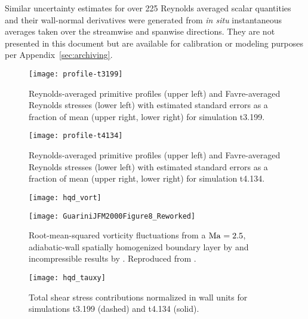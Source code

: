 Similar uncertainty estimates for over 225 Reynolds averaged scalar quantities
and their wall-normal derivatives were generated from \emph{in situ}
instantaneous averages taken over the streamwise and spanwise directions.  They
are not presented in this document but are available for calibration or modeling
purposes per Appendix~\ref{sec:archiving}.

\begin{figure}
\centering
\texttt{[image: profile-t3199]}
\caption[Profiles with quantified uncertainty for simulation t3.199]{%
    Reynolds-averaged primitive profiles (upper left) and Favre-averaged
    Reynolds stresses (lower left) with estimated standard errors
    as a fraction of mean (upper right, lower right) for simulation
    t3.199.\label{fig:profile-t3199}
}
\end{figure}

\begin{figure}
\centering
\texttt{[image: profile-t4134]}
\caption[Profiles with quantified uncertainty for simulation t4.134]{%
    Reynolds-averaged primitive profiles (upper left) and Favre-averaged
    Reynolds stresses (lower left) with estimated standard errors
    as a fraction of mean (upper right, lower right) for simulation
    t4.134.\label{fig:profile-t4134}
}
\end{figure}

\begin{figure}[p]
\centering
\texttt{[image: hqd\_vort]}
\caption[RMS vorticity fluctuations for simulations t3.199 and t4.134]{%
    Root-mean-squared vorticity fluctuations normalized in wall units for
    simulations t3.199 (dashed) and t4.134 (solid).\label{fig:hdq_vort}
}
\bigskip\medskip
\texttt{[image: GuariniJFM2000Figure8\_Reworked]}\hspace{1.5em}
\caption[RMS vorticity fluctuations reproduced from \citeauthor{Guarini2000Direct}]{%
    Root-mean-squared vorticity fluctuations from a $\mbox{Ma}_{} = 2.5$,
    adiabatic-wall spatially homogenized boundary layer by
    \citeauthor{Guarini2000Direct} and incompressible results by
    \citet{Spalart1988Direct}.  Reproduced from
    \citet{Guarini2000Direct}.\label{fig:hdq_vort_repo}
}
\end{figure}

\begin{figure}
\centering
\texttt{[image: hqd\_tauxy]}
\caption[Total shear stress contributions in simulations t3.199 and t4.134]{%
    Total shear stress contributions normalized in wall units for
    simulations t3.199 (dashed) and t4.134 (solid).\label{fig:hdq_tauxy}
}
\end{figure}

